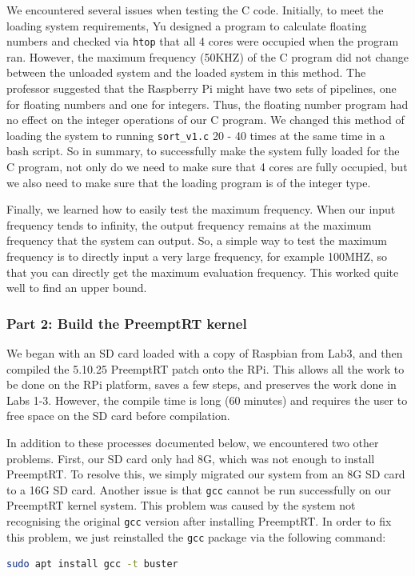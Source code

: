 \documentclass[a4paper,10pt]{article}
\newcommand{\code}[1]{\colorbox{light-gray}{\texttt{#1}}}
\begin{document}
We encountered several issues when testing the C code. Initially, to meet the loading system requirements, Yu designed a program to calculate floating numbers and checked via \code{htop} that all 4 cores were occupied when the program ran. However, the maximum frequency (50KHZ) of the C program did not change between the unloaded system and the loaded system in this method. The professor suggested that the Raspberry Pi might have two sets of pipelines, one for floating  numbers and one for integers. Thus, the floating number program had no effect on the integer operations of our C program. We changed this method of loading the system to running \code{sort\_v1.c} 20 - 40 times at the same time in a bash script. So in summary, to successfully make the system fully loaded for the C program, not only do we need to make sure that 4 cores are fully occupied, but we also need to make sure that the loading program is of the integer type.

Finally, we learned how to easily test the maximum frequency. When our input frequency tends to infinity, the output frequency remains at the maximum frequency that the system can output. So, a simple way to test the maximum frequency is to directly input a very large frequency, for example 100MHZ, so that you can directly get the maximum evaluation frequency. This worked quite well to find an upper bound. 



\subsubsection{Part 2: Build the PreemptRT kernel}

We began with an SD card loaded with a copy of Raspbian from Lab3, and then compiled the 5.10.25 PreemptRT patch onto the RPi. This allows all the work to be done on the RPi platform, saves a few steps, and preserves the work done in Labs 1-3. However, the compile time is long (60 minutes) and requires the user to free space on the SD card before compilation. 

In addition to these processes documented below, we encountered two other problems. First, our SD card only had 8G, which was not enough to install PreemptRT. To resolve this, we simply migrated our system from an 8G SD card to a 16G SD card. Another issue is that \code{gcc} cannot be run successfully on our PreemptRT kernel system. This problem was caused by the system not recognising the original \code{gcc} version after installing PreemptRT. In order to fix this problem, we just reinstalled the \code{gcc} package via the following command:
\begin{center}
\begin{lstlisting}[language=bash, label=code:code17] 
sudo apt install gcc -t buster
\end{lstlisting}
\end{center}\vspace{-1em}
\end{document}
